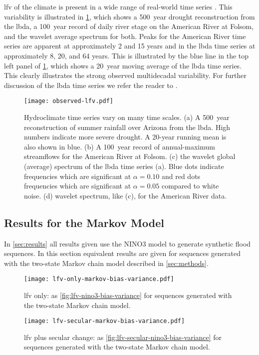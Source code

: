 \documentclass[
]{agujournal2018}
\begin{document}
\Acrfull{lfv} of the climate is present in a wide range of real-world time series \citep{Hodgkins:2017hw, Swierczynski:2012km, Cook:2010bz}.
This variability is illustrated in \cref{fig:observed-lfv}, which shows a \SI{500}{year} drought reconstruction from the \gls{lbda}, a \SI{100}{year} record of daily river stage on the American River at Folsom, and the wavelet \citep{Torrence:1998jp} average spectrum for both.
Peaks for the American River time series are apparent at approximately 2 and 15 years and in the \gls{lbda} time series at approximately 8, 20, and 64 years.
This is illustrated by the blue line in the top left panel of \cref{fig:observed-lfv}, which shows a \SI{20}{year} moving average of the \gls{lbda} time series.
This clearly illustrates the strong observed multidecadal variability.
For further discussion of the \gls{lbda} time series we refer the reader to \citet{Cook:2010bz}.
\begin{figure}
  \centering
  \texttt{[image: observed-lfv.pdf]}
  \caption{
    Hydroclimate time series vary on many time scales.
    (a) A \SI{500}{year} reconstruction of summer rainfall over Arizona from the \acrfull{lbda}.
    High numbers indicate more severe drought.
    A 20-year running mean is also shown in blue.
    (b) A \SI{100}{year} record of annual-maximum streamflows for the American River at Folsom.
    (c) the wavelet global (average) spectrum of the \gls{lbda} time series (a).
    Blue dots indicate frequencies which are significant at $\alpha=0.10$ and red dots frequencies which are significant at $\alpha=0.05$ compared to white noise.
    (d) wavelet spectrum, like (c), for the American River data.
  }\label{fig:observed-lfv}
\end{figure}

\subsection{Results for the Markov Model}

In \cref{sec:results} all results given use the NINO3 model to generate synthetic flood sequences.
In this section equivalent results are given for sequences generated with the two-state Markov chain model described in \cref{sec:methods}.

\begin{figure}
  \centering
  \texttt{[image: lfv-only-markov-bias-variance.pdf]}
  \caption{
    \Gls{lfv} only: as \cref{fig:lfv-nino3-bias-variance} for sequences generated with the two-state Markov chain model.
  }\label{fig:lfv-markov-bias-variance}
\end{figure}

\begin{figure}
  \centering
  \texttt{[image: lfv-secular-markov-bias-variance.pdf]}
  \caption{
    \Gls{lfv} plus secular change: as \cref{fig:lfv-secular-nino3-bias-variance} for sequences generated with the two-state Markov chain model.
  }\label{fig:lfv-secular-markov-bias-variance}
\end{figure}
\end{document}
